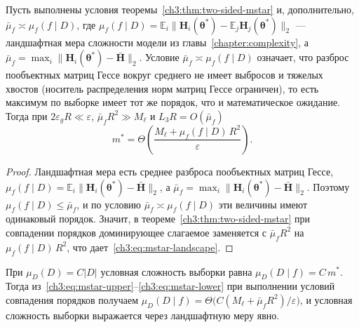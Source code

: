 \begin{corollary}\label{ch3:cor:mstar-landscape}
Пусть выполнены условия теоремы~\ref{ch3:thm:two-sided-mstar} и, дополнительно, $\bar\mu_f\asymp\mu_f(f\mid D)$, где $\mu_f(f\mid D)=\mathbb{E}_{i}\big\|\mathbf{H}_i(\boldsymbol{\theta}^*)-\mathbb{E}_{j}\mathbf{H}_j(\boldsymbol{\theta}^*)\big\|_2$ --- ландшафтная мера сложности модели из главы~\ref{chapter:complexity}, а $\bar\mu_f=\max_i\|\mathbf{H}_i(\boldsymbol{\theta}^*)-\bar{\mathbf{H}}\|_2$. Условие $\bar\mu_f\asymp\mu_f(f\mid D)$ означает, что разброс пообъектных матриц Гессе вокруг среднего не имеет выбросов и тяжелых хвостов (носитель распределения норм матриц Гессе ограничен), то есть максимум по выборке имеет тот же порядок, что и математическое ожидание. Тогда при $2\varepsilon_gR\ll\varepsilon$, $\bar\mu_f R^2\gg M_\ell$ и $L_3R=O(\bar\mu_f)$
\begin{equation}\label{ch3:eq:mstar-landscape}
  m^*=\Theta\!\left(\frac{M_\ell+\mu_f(f\mid D)\,R^2}{\varepsilon}\right).
\end{equation}
\end{corollary}
\begin{proof}
Ландшафтная мера есть среднее разброса пообъектных матриц Гессе, $\mu_f(f\mid D)=\mathbb{E}_{i}\big\|\mathbf{H}_i(\boldsymbol{\theta}^*)-\bar{\mathbf{H}}\big\|_2$, а $\bar\mu_f=\max_{i}\big\|\mathbf{H}_i(\boldsymbol{\theta}^*)-\bar{\mathbf{H}}\big\|_2$. Поэтому $\mu_f(f\mid D)\le\bar\mu_f$, и по условию $\bar\mu_f\asymp\mu_f(f\mid D)$ эти величины имеют одинаковый порядок. Значит, в теореме~\ref{ch3:thm:two-sided-mstar} при совпадении порядков доминирующее слагаемое заменяется с $\bar\mu_f R^2$ на $\mu_f(f\mid D)\,R^2$, что дает~\eqref{ch3:eq:mstar-landscape}. \end{proof}

\begin{remark}\label{ch3:rem:mstar-conditional}
При $\mu_D(D)=C\lvert D\rvert$ условная сложность выборки равна $\mu_D(D\mid f)=C\,m^*$. Тогда из~\eqref{ch3:eq:mstar-upper}--\eqref{ch3:eq:mstar-lower} при выполнении условий совпадения порядков получаем $\mu_D(D\mid f)=\Theta\bigl(C(M_\ell+\bar\mu_f R^2)/\varepsilon\bigr)$, и условная сложность выборки выражается через ландшафтную меру явно.
\end{remark}

